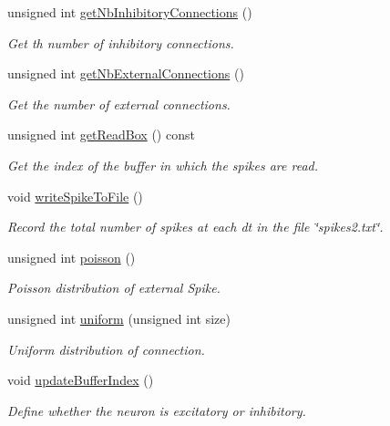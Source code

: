 \begin{DoxyCompactItemize}
unsigned int \hyperlink{classNetwork_abbd9cacd4ac8393670d659bc326de701}{get\-Nb\-Inhibitory\-Connections} ()
\begin{DoxyCompactList}\small\item\em Get th number of inhibitory connections. \end{DoxyCompactList}\item 
unsigned int \hyperlink{classNetwork_a9045d83b08661a561b8026feb34e408a}{get\-Nb\-External\-Connections} ()
\begin{DoxyCompactList}\small\item\em Get the number of external connections. \end{DoxyCompactList}\item 
unsigned int \hyperlink{classNetwork_a526fa535ce908e13c2c1ed958b2559a1}{get\-Read\-Box} () const 
\begin{DoxyCompactList}\small\item\em Get the index of the buffer in which the spikes are read. \end{DoxyCompactList}\item 
void \hyperlink{classNetwork_ad29becc42053fc83b9fab0152f95ecb7}{write\-Spike\-To\-File} ()
\begin{DoxyCompactList}\small\item\em Record the total number of spikes at each dt in the file \char`\"{}spikes2.\-txt\char`\"{}. \end{DoxyCompactList}\item 
unsigned int \hyperlink{classNetwork_a39ab88a137f3f3cee99f1a5f0a47a867}{poisson} ()
\begin{DoxyCompactList}\small\item\em Poisson distribution of external Spike. \end{DoxyCompactList}\item 
unsigned int \hyperlink{classNetwork_a28c7fc76c8eff0fae4757822df03177e}{uniform} (unsigned int size)
\begin{DoxyCompactList}\small\item\em Uniform distribution of connection. \end{DoxyCompactList}\item 
void \hyperlink{classNetwork_a208390d531b3a7356a4cf47e5e0a3579}{update\-Buffer\-Index} ()
\begin{DoxyCompactList}\small\item\em Define whether the neuron is excitatory or inhibitory. \end{DoxyCompactList}\item 

\end{DoxyCompactItemize}
